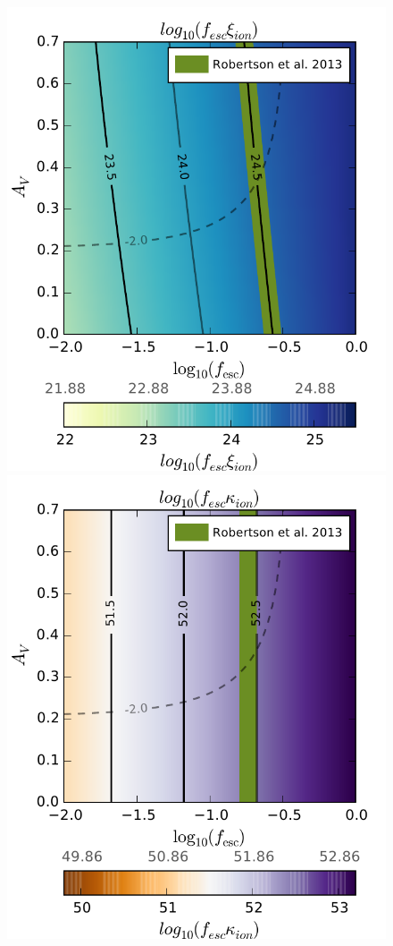 \begin{landscape}
\begin{figure}
  \includegraphics[width=0.25\paperheight]{plots/Fig5b.pdf}
  \includegraphics[width=0.25\paperheight]{plots/Fig5c.pdf}


\end{figure}
\end{landscape}
